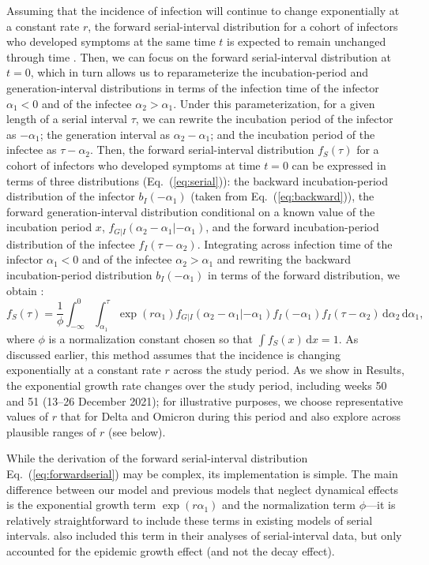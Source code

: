\documentclass[12pt]{article}
\newcommand{\eref}[1]{Eq.~(\ref{eq:#1})}
\newcommand{\dd}[1]{\ensuremath{\, \mathrm{d}#1}}
\newcommand{\dx}{\dd{x}}
\begin{document}
Assuming that the incidence of infection will continue to change exponentially at a constant rate $r$, the forward serial-interval distribution for a cohort of infectors who developed symptoms at the same time $t$ is expected to remain unchanged through time \citep{park2021forward}. 
Then, we can focus on the forward serial-interval distribution at $t=0$, which in turn allows us to reparameterize the incubation-period and generation-interval distributions in terms of the infection time of the infector $\alpha_1 < 0$ and of the infectee $\alpha_2 > \alpha_1$. 
Under this parameterization, for a given length of a serial interval $\tau$, we can rewrite the incubation period of the infector as $-\alpha_1$; the generation interval as $\alpha_2 - \alpha_1$; and the incubation period of the infectee as $\tau - \alpha_2$.
Then, the forward serial-interval distribution $f_S(\tau)$ for a cohort of infectors who developed symptoms at time $t = 0$ can be expressed in terms of three distributions (\eref{serial}): the backward incubation-period distribution of the infector $b_I(-\alpha_1)$ (taken from \eref{backward}), the forward generation-interval distribution conditional on a known value of the incubation period $x$, $f_{G|I}(\alpha_2-\alpha_1|-\alpha_1)$, and the forward incubation-period distribution of the infectee $f_I(\tau - \alpha_2)$.
Integrating across infection time of the infector $\alpha_1 < 0$ and of the infectee $\alpha_2 > \alpha_1$ and rewriting the backward incubation-period distribution $b_I(-\alpha_1)$ in terms of the forward distribution, we obtain \citep{park2021forward}:
\begin{equation}
f_S(\tau) = \frac{1}{\phi} \int_{-\infty}^0\int_{\alpha_1}^\tau \exp(r \alpha_1) f_{G|I}(\alpha_2 - \alpha_1|- \alpha_1) f_I(- \alpha_1) f_I(\tau - \alpha_2) \dd \alpha_2 \dd \alpha_1,
\label{eq:forwardserial}
\end{equation}
where $\phi$ is a normalization constant chosen so that $\int f_S(x) \dx = 1$.
As discussed earlier, this method assumes that the incidence is changing exponentially at a constant rate $r$ across the study period.
As we show in Results, the exponential growth rate changes over the study period, including weeks 50 and 51 (13--26 December 2021);
for illustrative purposes, we choose representative values of $r$ that for Delta and Omicron during this period and also explore across plausible ranges of $r$ (see below).

While the derivation of the forward serial-interval distribution \eref{forwardserial} may be complex, its implementation is simple.
The main difference between our model and previous models that neglect dynamical effects \citep{ganyani2020estimating,he2020temporal,zhao2021estimating,hart2022generation} is the exponential growth term $\exp(r \alpha_1)$ and the normalization term $\phi$---it is relatively straightforward to include these terms in existing models of serial intervals.
\cite{ferretti2020quantifying, ferretti2020timing} also included this term in their analyses of serial-interval data, but only accounted for the epidemic growth effect (and not the decay effect).
\end{document}
